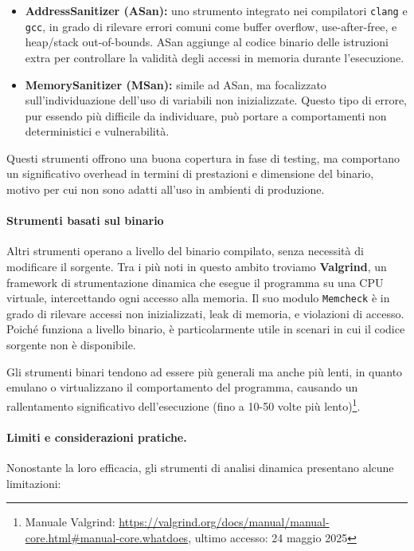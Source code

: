 \begin{itemize}
  \item \textbf{AddressSanitizer (ASan):} uno strumento integrato nei
    compilatori \texttt{clang} e \texttt{gcc}, in grado di rilevare errori comuni
    come buffer overflow, use-after-free, e heap/stack out-of-bounds. ASan
    aggiunge al codice binario delle istruzioni extra per controllare la
    validità degli accessi in memoria durante l'esecuzione.

  \item \textbf{MemorySanitizer (MSan):} simile ad ASan, ma focalizzato sull'individuazione
    dell'uso di variabili non inizializzate. Questo tipo di errore, pur essendo più
    difficile da individuare, può portare a comportamenti non deterministici e
    vulnerabilità.
\end{itemize}

Questi strumenti offrono una buona copertura in fase di testing, ma comportano
un significativo overhead in termini di prestazioni e dimensione del binario, motivo
per cui non sono adatti all'uso in ambienti di produzione.

\paragraph{Strumenti basati sul binario}
Altri strumenti operano a livello del binario compilato, senza necessità di modificare
il sorgente. Tra i più noti in questo ambito troviamo \textbf{Valgrind}, un
framework di strumentazione dinamica che esegue il programma su una CPU virtuale,
intercettando ogni accesso alla memoria. Il suo modulo \texttt{Memcheck} è in grado
di rilevare accessi non inizializzati, leak di memoria, e violazioni di accesso.
Poiché funziona a livello binario, è particolarmente utile in scenari in cui il codice
sorgente non è disponibile.

Gli strumenti binari tendono ad essere più generali ma anche più lenti, in
quanto emulano o virtualizzano il comportamento del programma, causando un rallentamento
significativo dell'esecuzione (fino a 10-50 volte più lento)\footnote{Manuale
Valgrind: \url{https://valgrind.org/docs/manual/manual-core.html\#manual-core.whatdoes},
ultimo accesso: 24 maggio 2025}.

\paragraph{Limiti e considerazioni pratiche.}
Nonostante la loro efficacia, gli strumenti di analisi dinamica presentano
alcune limitazioni:

